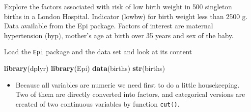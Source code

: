 \documentclass[
]{book}
\newenvironment{Shaded}{\begin{snugshade}}{\end{snugshade}}
\newcommand{\AttributeTok}[1]{\textcolor[rgb]{0.13,0.29,0.53}{#1}}
\newcommand{\ConstantTok}[1]{\textcolor[rgb]{0.56,0.35,0.01}{#1}}
\newcommand{\DecValTok}[1]{\textcolor[rgb]{0.00,0.00,0.81}{#1}}
\newcommand{\FunctionTok}[1]{\textcolor[rgb]{0.13,0.29,0.53}{\textbf{#1}}}
\newcommand{\NormalTok}[1]{#1}
\newcommand{\OtherTok}[1]{\textcolor[rgb]{0.56,0.35,0.01}{#1}}
\newcommand{\SpecialCharTok}[1]{\textcolor[rgb]{0.81,0.36,0.00}{\textbf{#1}}}
\newcommand{\StringTok}[1]{\textcolor[rgb]{0.31,0.60,0.02}{#1}}
\providecommand{\tightlist}{%
  \setlength{\itemsep}{0pt}\setlength{\parskip}{0pt}}
\begin{document}
Explore the factors associated with risk of low birth weight
in 500 singleton births in a London Hospital. Indicator (lowbw) for birth weight less than 2500 g. Data available from the Epi package. Factors of interest are
maternal hypertension (hyp), mother's age at birth over 35 years and sex of the baby.

Load the \texttt{Epi} package and the data set and look at its content

\begin{Shaded}
\begin{Highlighting}[]
\FunctionTok{library}\NormalTok{(dplyr)}
\FunctionTok{library}\NormalTok{(Epi)}
\FunctionTok{data}\NormalTok{(births)}
\FunctionTok{str}\NormalTok{(births)}
\end{Highlighting}
\end{Shaded}

\begin{itemize}
\tightlist
\item
  Because all variables are numeric we need first to do a little housekeeping.
  Two of them are directly converted into factors,
  and categorical versions are created of two continuous variables by function \texttt{cut()}.
\end{itemize}

\begin{Shaded}
\end{Shaded}
\end{document}
